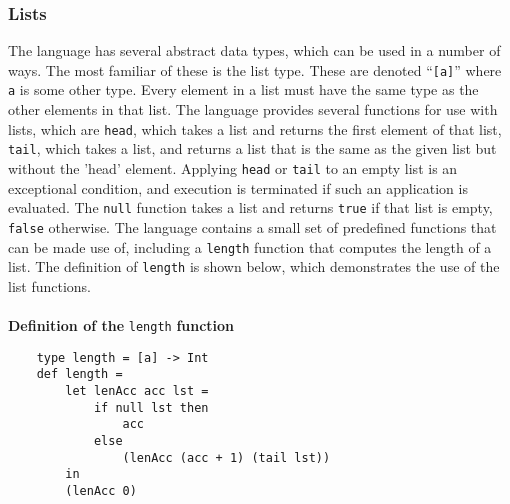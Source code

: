 \documentclass{article}
\begin{document}
\subsubsection{Lists}
The language has several abstract data types, which can be used in a number of ways. The most familiar of these is the list type. These are denoted ``\texttt{[a]}'' where \texttt{a} is some other type. Every element in a list must have the same type as the other elements in that list. The language provides several functions for use with lists, which are \texttt{head}, which takes a list and returns the first element of that list, \texttt{tail}, which takes a list, and returns a list that is the same as the given list but without the 'head' element. Applying \texttt{head} or \texttt{tail} to an empty list is an exceptional condition, and execution is terminated if such an application is evaluated. The \texttt{null} function takes a list and returns \texttt{true} if that list is empty, \texttt{false} otherwise. The language contains a small set of predefined functions that can be made use of, including a \texttt{length} function that computes the length of a list. The definition of \texttt{length} is shown below, which demonstrates the use of the list functions.
\\\\
\indent\textbf{Definition of the }\texttt{length}\textbf{ function}
\begin{verbatim}
    type length = [a] -> Int
    def length =
        let lenAcc acc lst =
            if null lst then
                acc
            else
                (lenAcc (acc + 1) (tail lst))
        in
        (lenAcc 0)
\end{verbatim}
\end{document}
